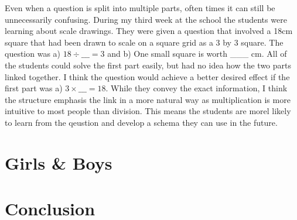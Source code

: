 \documentclass[11pt, a4paper, notitlepage]{article}
\begin{document}
\par
Even when a question is split into multiple parts, often times it can still be unnecessarily confusing. During my third week at the school the students were learning about scale drawings. They were given a question that involved a 18cm square that had been drawn to scale on a square grid as a 3 by 3 square. The question was a) $18 \div \_\_\_= 3$ and b) One small square is worth \_\_\_ cm. All of the students could solve the first part easily, but had no idea how the two parts linked together. I think the question would achieve a better desired effect if the first part was a) $3\times\_\_\_ = 18$. While they convey the exact information, I think the structure emphasis the link in a more natural way as multiplication is more intuitive to most people than division. This means the students are morel likely to learn from the qeustion and develop a schema they can use in the future.

\section*{Girls \& Boys}
\section*{Conclusion}



\end{document}
